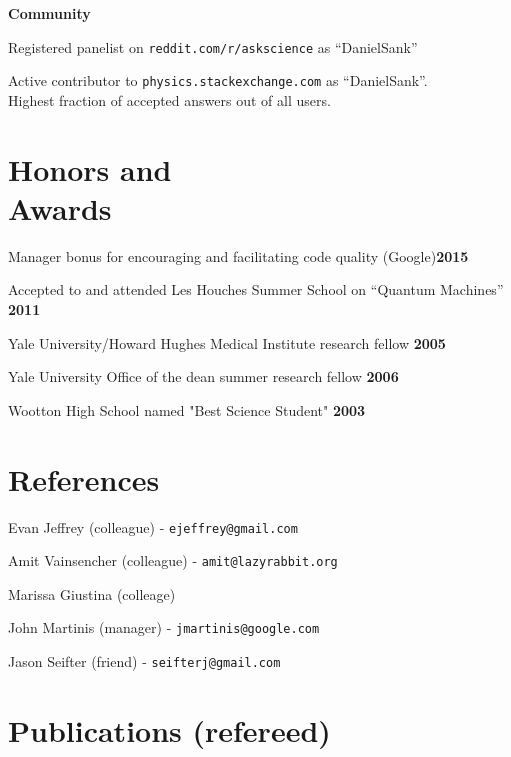 \documentclass[margin=2cm,line]{res}
\begin{document}
\begin{resume}
{\bf Community}
\begin{list4}
\item Registered panelist on \texttt{reddit.com/r/askscience} as ``DanielSank''
\item Active contributor to \texttt{physics.stackexchange.com} as ``DanielSank''.\\
Highest fraction of accepted answers out of all users.
\end{list4}


\section{\sc Honors and\\ Awards}
\begin{list3}
\item Manager bonus for encouraging and facilitating code quality (Google)\hfill {\bf 2015}
\item Accepted to and attended Les Houches Summer School on ``Quantum Machines'' \hfill {\bf 2011}
\item Yale University/Howard Hughes Medical Institute research fellow \hfill {\bf 2005}
\item Yale University Office of the dean summer research fellow \hfill {\bf 2006}
\item Wootton High School named "Best Science Student" \hfill {\bf 2003}
\end{list3}

\section{\sc References}
\begin{list3}
\item Evan Jeffrey (colleague) - \texttt{ejeffrey@gmail.com}
\item Amit Vainsencher (colleague) - \texttt{amit@lazyrabbit.org}
\item Marissa Giustina (colleage)
\item John Martinis (manager) - \texttt{jmartinis@google.com}
\item Jason Seifter (friend) - \texttt{seifterj@gmail.com}
\end{list3}

\pagebreak


\section{\sc Publications (refereed)}


\end{resume}
\end{document}
